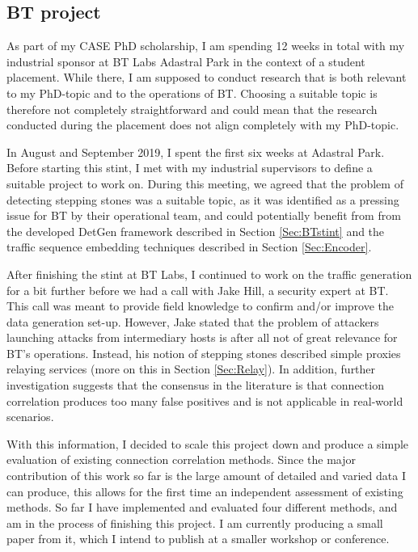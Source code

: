 \documentclass[a4paper,12pt,twoside]{article}
\begin{document}
\subsection{BT project}\label{Bla}

As part of my CASE PhD scholarship, I am spending 12 weeks in total with my industrial sponsor at BT Labs Adastral Park in the context of a student placement. While there, I am supposed to conduct research that is both relevant to my PhD-topic and to the operations of BT. Choosing a suitable topic is therefore not completely straightforward and could mean that the research conducted during the placement does not align completely with my PhD-topic.


In August and September 2019, I spent the first six weeks at Adastral Park. Before starting this stint, I met with my industrial supervisors to define a suitable project to work on. During this meeting, we agreed that the problem of detecting stepping stones was a suitable topic, as it was identified as a pressing issue for BT by their operational team, and could potentially benefit from from the developed DetGen framework described in Section \ref{Sec:BTstint} and the traffic sequence embedding techniques described in Section \ref{Sec:Encoder}.


After finishing the stint at BT Labs, I continued to work on the traffic generation for a bit further before we had a call with Jake Hill, a security expert at BT. This call was meant to provide field knowledge to confirm and/or improve the data generation set-up. However, Jake stated that the problem of attackers launching attacks from intermediary hosts is after all not of great relevance for BT's operations. Instead, his notion of stepping stones described simple proxies relaying services (more on this in Section \ref{Sec:Relay}). In addition, further investigation suggests that the consensus in the literature is that connection correlation produces too many false positives and is not applicable in real-world scenarios.

With this information, I decided to scale this project down and produce a simple evaluation of existing connection correlation methods. Since the major contribution of this work so far is the large amount of detailed and varied data I can produce, this allows for the first time an independent assessment of existing methods. So far I have implemented and evaluated four different methods, and am in the process of finishing this project. I am currently producing a small paper from it, which I intend to publish at a smaller workshop or conference. 
\end{document}
